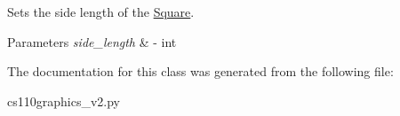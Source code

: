 Sets the side length of the \mbox{\hyperlink{classcs110graphics__v2_1_1Square}{Square}}. 


\begin{DoxyParams}{Parameters}
{\em side\+\_\+length} & -\/ int \\
\hline
\end{DoxyParams}


The documentation for this class was generated from the following file\+:\begin{DoxyCompactItemize}
\item 
cs110graphics\+\_\+v2.\+py\end{DoxyCompactItemize}
